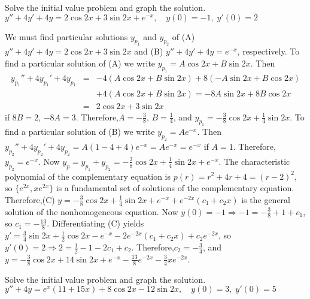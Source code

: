 \documentclass{ximera}
\begin{document}
\begin{problem}\label{exer:5.5.34} 
Solve the initial value problem and graph the solution. $y''+4y'+4y=2\cos2x+3\sin2x+e^{-x} , \quad   y(0)=-1,\;  y'(0)=2$

\begin{solution}
    We must find particular solutions $y_{p_1}$ and $y_{p_2}$ of
(A) $y''+4y'+4y=2\cos2x+3\sin2x$ and
(B) $y''+4y'+4y=e^{-x}$,  respectively.
To find a particular solution of (A) we write
 $y_{p_1}=A\cos2x+B\sin2x$. Then
\begin{eqnarray*}
y_{p_1}''+4y_{p_1}'+4y_{p_1}&=&
-4(A\cos2x+B\sin2x)+8(-A\sin2x+B\cos2x)\\ &&+4(A\cos2x+B\sin2x)
=-8A\sin2x+8B\cos2x\\ &=& 2\cos2x+3\sin2x
\end{eqnarray*}
if $8B=2$, $-8A=3$. Therefore,$A=-\frac{3}{8}$, $B=\frac{1}{4}$,
and $y_{p_1}=-\frac{3}{8}\cos2x+\frac{1}{4}\sin2x$. To find a
particular solution of (B) we write $y_{p_2}=Ae^{-x}$. Then
$y_{p_2}''+4y_{p_2}'+4y_{p_2}=A(1-4+4)e^{-x}=Ae^{-x}=e^{-x}$ if $A=1$.
Therefore,$y_{p_2}=e^{-x}$. Now $y_p=y_{p_1}+y_{p_2}=
-\frac{3}{8}\cos2x+\frac{1}{4}\sin2x+e^{-x}$. The characteristic
polynomial of the complementary equation is $p(r)=r^2+4r+4=(r-2)^2$,
so $\{e^{2x},xe^{2x}\}$ is a fundamental set of solutions of the
complementary equation. Therefore,(C)
$y=-\frac{3}{8}\cos2x+\frac{1}{4}\sin2x+e^{-x}+e^{-2x}(c_1+c_2x)$
is the general solution of the nonhomogeneous equation. Now
$y(0)=-1\Rightarrow -1=-\frac{3}{8}+1+c_1$, so
$c_1=-\frac{13}{8}$. Differentiating (C) yields
$y'=\frac{3}{4}\sin2x+\frac{1}{2}\cos2x-e^{-x}-2e^{-2x}(c_1+c_2x)
+c_2e^{-2x}$, so $y'(0)=2\Rightarrow 2=\frac{1}{2}-1-2c_1+c_2$.
Therefore,$c_2=-\frac{3}{4}$, and
$y=-\frac{3}{8}\cos2x+{1}{4}\sin2x+e^{-x}-\frac{13}{8}e^{-2x}-
\frac{3}{4}xe^{-2x}$.
\end{solution}
\end{problem}

\begin{problem}\label{exer:5.5.35} 
Solve the initial value problem and graph the solution. $y''+4y=e^x(11+15x)+8\cos2x-12\sin2x , \quad   y(0)=3,\;  y'(0)=5$
\end{problem}
\end{document}
